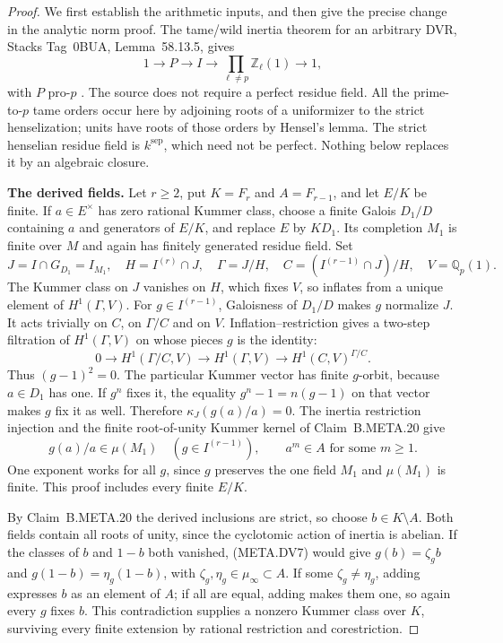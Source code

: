 \begin{proof}
We first establish the arithmetic inputs, and then
give the precise change in the analytic norm proof.
The tame/wild inertia theorem for an arbitrary DVR,
Stacks Tag~0BUA, Lemma~58.13.5, gives
\[
             1\longrightarrow P\longrightarrow I
               \longrightarrow \prod_{\ell\ne p}\mathbb Z_\ell(1)
               \longrightarrow1,                            \tag{META.DV6}
\]
with $P$ pro-$p$ \citep{AN_Stacks0BUA}.
The source does not require a perfect residue field.
All the prime-to-$p$ tame orders occur here by
adjoining roots of a uniformizer to the strict
henselization; units have roots of those orders by
Hensel's lemma.  The strict henselian residue field
is $k^{\mathrm{sep}}$, which need not be perfect.
Nothing below replaces it by an algebraic closure.

\medskip\noindent\textbf{The derived fields.}
Let $r\ge2$, put $K=F_r$ and $A=F_{r-1}$, and
let $E/K$ be finite.
If $a\in E^\times$ has zero rational Kummer class,
choose a finite Galois $D_1/D$ containing $a$ and
generators of $E/K$, and replace $E$ by $KD_1$.
Its completion $M_1$ is finite over $M$ and again
has finitely generated residue field.
Set
\[
 J=I\cap G_{D_1}=I_{M_1},\quad
 H=I^{(r)}\cap J,\quad \Gamma=J/H,\quad
 C=(I^{(r-1)}\cap J)/H,\quad V=\mathbb Q_p(1).
\]
The Kummer class on $J$ vanishes on $H$, which fixes
$V$, so inflates from a unique element of
$H^1(\Gamma,V)$.
For $g\in I^{(r-1)}$, Galoisness of $D_1/D$ makes
$g$ normalize $J$.
It acts trivially on $C$, on $\Gamma/C$ and on $V$.
Inflation--restriction gives a two-step filtration
of $H^1(\Gamma,V)$ on whose pieces $g$ is the identity:
\[
 0\longrightarrow H^1(\Gamma/C,V)
  \longrightarrow H^1(\Gamma,V)
  \longrightarrow H^1(C,V)^{\Gamma/C}.
\]
Thus $(g-1)^2=0$.
The particular Kummer vector has finite $g$-orbit,
because $a\in D_1$ has one.  If $g^n$ fixes it,
the equality $g^n-1=n(g-1)$ on that vector makes
$g$ fix it as well.
Therefore $\kappa_J(g(a)/a)=0$.
The inertia restriction injection and the finite
root-of-unity Kummer kernel of Claim~B.META.20 give
\[
       g(a)/a\in\mu(M_1)\quad(g\in I^{(r-1)}),\qquad
                         a^m\in A\text{ for some }m\ge1.       \tag{META.DV7}
\]
One exponent works for all $g$, since $g$ preserves
the one field $M_1$ and $\mu(M_1)$ is finite.
This proof includes every finite $E/K$.

By Claim~B.META.20 the derived inclusions are strict,
so choose $b\in K\setminus A$.
Both fields contain all roots of unity, since the
cyclotomic action of inertia is abelian.
If the classes of $b$ and $1-b$ both vanished,
(META.DV7) would give
$g(b)=\zeta_gb$ and $g(1-b)=\eta_g(1-b)$, with
$\zeta_g,\eta_g\in\mu_\infty\subset A$.
If some $\zeta_g\ne\eta_g$, adding expresses $b$
as an element of $A$; if all are equal, adding
makes them one, so again every $g$ fixes $b$.
This contradiction supplies a nonzero Kummer class
over $K$, surviving every finite extension by
rational restriction and corestriction.


\end{proof}
